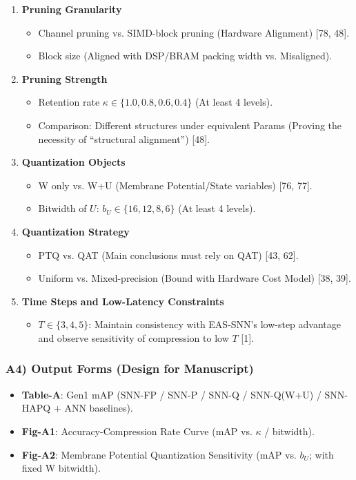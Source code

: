 \documentclass[10pt,a4paper]{article}
\begin{document}
\begin{enumerate}
    \item \textbf{Pruning Granularity}
    \begin{itemize}
        \item Channel pruning vs. SIMD-block pruning (Hardware Alignment) [78, 48].
        \item Block size (Aligned with DSP/BRAM packing width vs. Misaligned).
    \end{itemize}
    
    \item \textbf{Pruning Strength}
    \begin{itemize}
        \item Retention rate $\kappa \in \{1.0, 0.8, 0.6, 0.4\}$ (At least 4 levels).
        \item Comparison: Different structures under equivalent Params (Proving the necessity of ``structural alignment'') [48].
    \end{itemize}
    
    \item \textbf{Quantization Objects}
    \begin{itemize}
        \item W only vs. W+U (Membrane Potential/State variables) [76, 77].
        \item Bitwidth of $U$: $b_U \in \{16, 12, 8, 6\}$ (At least 4 levels).
    \end{itemize}
    
    \item \textbf{Quantization Strategy}
    \begin{itemize}
        \item PTQ vs. QAT (Main conclusions must rely on QAT) [43, 62].
        \item Uniform vs. Mixed-precision (Bound with Hardware Cost Model) [38, 39].
    \end{itemize}
    
    \item \textbf{Time Steps and Low-Latency Constraints}
    \begin{itemize}
        \item $T \in \{3, 4, 5\}$: Maintain consistency with EAS-SNN's low-step advantage and observe sensitivity of compression to low $T$ [1].
    \end{itemize}
\end{enumerate}

\subsubsection{A4) Output Forms (Design for Manuscript)}
\begin{itemize}
    \item \textbf{Table-A}: Gen1 mAP (SNN-FP / SNN-P / SNN-Q / SNN-Q(W+U) / SNN-HAPQ + ANN baselines).
    \item \textbf{Fig-A1}: Accuracy-Compression Rate Curve (mAP vs. $\kappa$ / bitwidth).
    \item \textbf{Fig-A2}: Membrane Potential Quantization Sensitivity (mAP vs. $b_U$; with fixed W bitwidth).
\end{itemize}
\end{document}
